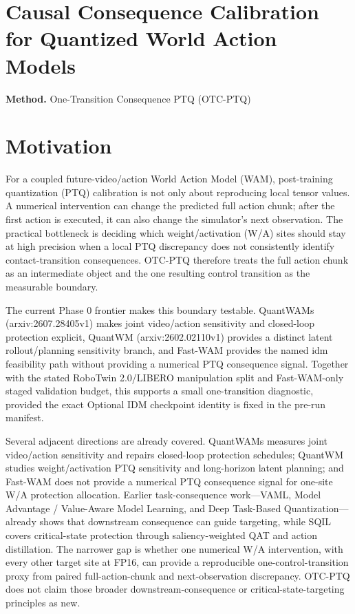 \documentclass[10pt,a4paper]{article}
\begin{document}
\section*{Causal Consequence Calibration for Quantized World Action Models}
\textbf{Method.} One-Transition Consequence PTQ (OTC-PTQ)
\section*{Motivation}
For a coupled future-video/action World Action Model (WAM), post-training quantization (PTQ) calibration is not only about reproducing local tensor values. A numerical intervention can change the predicted full action chunk;\allowbreak{} after the first action is executed, it can also change the simulator's next observation. The practical bottleneck is deciding which weight/activation (W/A) sites should stay at high precision when a local PTQ discrepancy does not consistently identify contact-transition consequences. OTC-PTQ therefore treats the full action chunk as an intermediate object and the one resulting control transition as the measurable boundary.

The current Phase 0 frontier makes this boundary testable. QuantWAMs (arxiv:2607.28405v1) makes joint video/action sensitivity and closed-loop protection explicit, QuantWM (arxiv:2602.02110v1) provides a distinct latent rollout/planning sensitivity branch, and Fast-WAM provides the named idm feasibility path without providing a numerical PTQ consequence signal. Together with the stated RoboTwin 2.0/LIBERO manipulation split and Fast-WAM-only staged validation budget, this supports a small one-transition diagnostic, provided the exact Optional IDM checkpoint identity is fixed in the pre-run manifest.

Several adjacent directions are already covered. QuantWAMs measures joint video/action sensitivity and repairs closed-loop protection schedules;\allowbreak{} QuantWM studies weight/activation PTQ sensitivity and long-horizon latent planning;\allowbreak{} and Fast-WAM does not provide a numerical PTQ consequence signal for one-site W/A protection allocation. Earlier task-consequence work---VAML, Model Advantage / Value-Aware Model Learning, and Deep Task-Based Quantization---already shows that downstream consequence can guide targeting, while SQIL covers critical-state protection through saliency-weighted QAT and action distillation. The narrower gap is whether one numerical W/A intervention, with every other target site at FP16, can provide a reproducible one-control-transition proxy from paired full-action-chunk and next-observation discrepancy. OTC-PTQ does not claim those broader downstream-consequence or critical-state-targeting principles as new.
\end{document}
